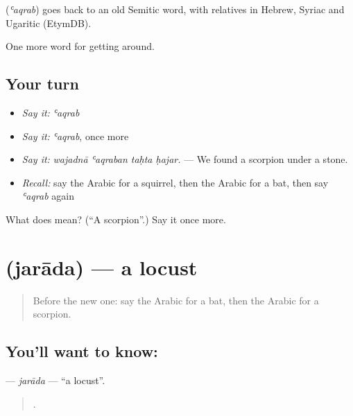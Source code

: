 \begin{cousinweb}
\textbf{} (\emph{ʿaqrab}) goes back to an old Semitic word, with relatives in Hebrew, Syriac and Ugaritic (EtymDB).
\end{cousinweb}

\begin{grammarlens}[title={What you've built}]
One more word for getting around.
\end{grammarlens}

\subsection*{Your turn}
\begin{itemize}
\raggedright
  \item \emph{Say it:} \emph{ʿaqrab}
  \item \emph{Say it:} \emph{ʿaqrab}, once more
  \item \emph{Say it:} \emph{wajadnā ʿaqraban taḥta ḥajar.} — We found a scorpion under a stone.
  \item \emph{Recall:} say the Arabic for a squirrel, then the Arabic for a bat, then say \emph{ʿaqrab} again
\end{itemize}

\begin{tcolorbox}[breakable,colback=teal!4,colframe=teal!35!black,title={Before you move on}]
What does  mean? (\textquotedblleft{}A scorpion\textquotedblright{}.) Say it once more.
\end{tcolorbox}
\section[\texorpdfstring{\ar{جرادة} (jarāda)}{جرادة (jarāda)}]{ (jarāda) — a locust}

\label{lesson:AR-C476-jarada}



\begin{quote}
Before the new one: say the Arabic for a bat, then the Arabic for a scorpion.
\end{quote}

\subsection*{You'll want to know: }
\textbf{} — \emph{jarāda} — \textquotedblleft{}a locust\textquotedblright{}.

\begin{quote}
    .
\end{quote}

